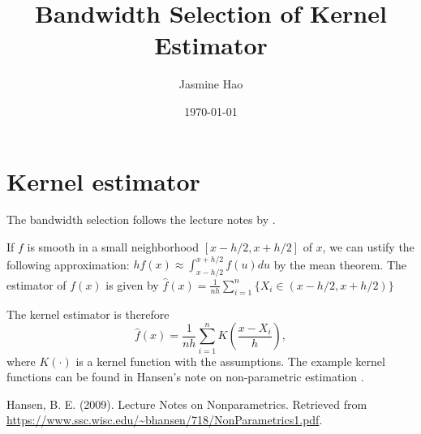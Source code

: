 \documentclass{article}
\title{Bandwidth Selection of Kernel Estimator}
\author{Jasmine Hao}
\date{\today}
\begin{document}
\maketitle

\section{Kernel estimator}
The bandwidth selection follows the lecture notes by \cite{Sun2013}.

If $f$ is smooth in a small neighborhood $[x-h/2,x+h/2]$ of $x$, we can ustify the following approximation:
$h f(x) \approx \int_{x-h/2}^{x+h/2} f(u) d u $ by the mean theorem.
The estimator of $f(x)$ is given by $\hat{f}(x) = \frac{1}{nh} \sum_{i=1}^n \{ X_i \in (x-h/2,x+h/2) \}$

The kernel estimator is therefore
\[
\hat{f}(x) = \frac{1}{nh} \sum_{i=1}^n K(\frac{x - X_i}{h}),
\]
where $K(\cdot)$ is a kernel function with the assumptions.
The example kernel functions can be found in Hansen's note on non-parametric estimation \cite{Hansen2009}.

Hansen, B. E. (2009). Lecture Notes on Nonparametrics. Retrieved from \url{https://www.ssc.wisc.edu/~bhansen/718/NonParametrics1.pdf}.
\end{document}

